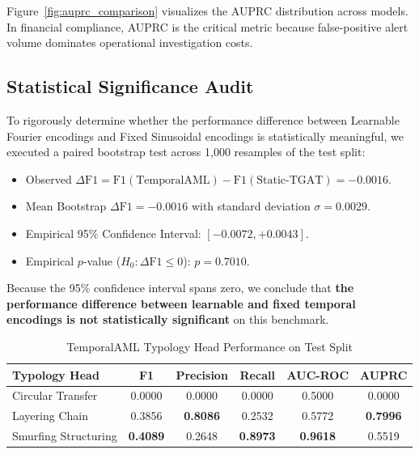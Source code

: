 \documentclass[conference]{IEEEtran}
\begin{document}
Figure~\ref{fig:auprc_comparison} visualizes the AUPRC distribution across models. In financial compliance, AUPRC is the critical metric because false-positive alert volume dominates operational investigation costs.

\subsection{Statistical Significance Audit}
To rigorously determine whether the performance difference between Learnable Fourier encodings and Fixed Sinusoidal encodings is statistically meaningful, we executed a paired bootstrap test across 1,000 resamples of the test split:
\begin{itemize}
    \item Observed $\Delta \text{F1} = \text{F1}(\text{TemporalAML}) - \text{F1}(\text{Static-TGAT}) = -0.0016$.
    \item Mean Bootstrap $\Delta \text{F1} = -0.0016$ with standard deviation $\sigma = 0.0029$.
    \item Empirical 95\% Confidence Interval: $[-0.0072, +0.0043]$.
    \item Empirical $p$-value ($H_0: \Delta \text{F1} \le 0$): $p = 0.7010$.
\end{itemize}
Because the 95\% confidence interval spans zero, we conclude that \textbf{the performance difference between learnable and fixed temporal encodings is not statistically significant} on this benchmark.

\begin{table}[!htbp]
\centering
\caption{TemporalAML Typology Head Performance on Test Split}
\label{tab:typology_results}
\begin{tabular}{lccccc}
\toprule
\textbf{Typology Head} & \textbf{F1} & \textbf{Precision} & \textbf{Recall} & \textbf{AUC-ROC} & \textbf{AUPRC} \\
\midrule
Circular Transfer & 0.0000 & 0.0000 & 0.0000 & 0.5000 & 0.0000 \\
Layering Chain & 0.3856 & \textbf{0.8086} & 0.2532 & 0.5772 & \textbf{0.7996} \\
Smurfing Structuring & \textbf{0.4089} & 0.2648 & \textbf{0.8973} & \textbf{0.9618} & 0.5519 \\
\bottomrule
\end{tabular}
\end{table}
\end{document}

